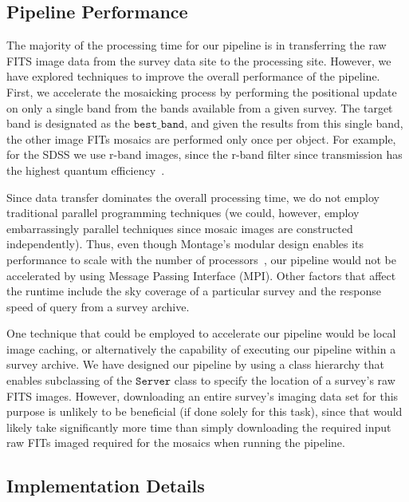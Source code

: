 \documentclass[authoryear, 12pt, 5p, times]{elsarticle}
\begin{document}
\subsection{Pipeline Performance}	

The majority of the processing time for our pipeline is in transferring the raw FITS image data from the survey data site to the processing site. However, we have explored techniques to improve the overall performance of the pipeline. First, we accelerate the mosaicking process by performing the positional update on only a single band from the bands available from a given survey. The target band is designated as the $\texttt{best\_band}$, and given the results from this single band, the other image FITs mosaics are performed only once per object. For example, for the SDSS we use r-band images, since the r-band filter since transmission has the highest quantum efficiency~\citep{edr}.

Since data transfer dominates the overall processing time, we do not employ traditional parallel programming techniques (we could, however, employ embarrassingly parallel techniques since mosaic images are constructed independently). Thus, even though Montage's modular design enables its performance to scale with the number of processors~\citep{montage}, our pipeline would not be accelerated by using  Message Passing Interface (MPI).  Other factors that affect the runtime include the sky coverage of a particular survey and the response speed of query from a survey archive.

One technique that could be employed to accelerate our pipeline would be local image caching, or alternatively the capability of executing our pipeline within a survey archive. We have designed our pipeline by using a class hierarchy that enables subclassing of the $\texttt{Server}$ class to specify the location of a survey's raw FITS images. However, downloading an entire survey's imaging data set for this purpose is unlikely to be beneficial (if done solely for this task), since that would likely take significantly more time than simply downloading the required input raw FITs imaged required for the mosaics when running the pipeline.

\subsection{Implementation Details}
\end{document}
